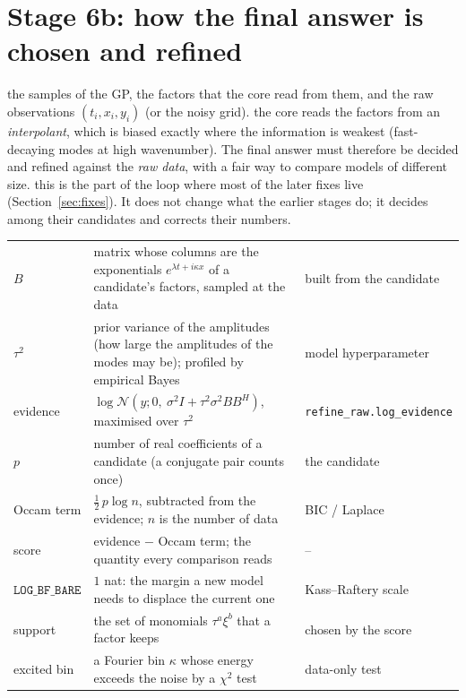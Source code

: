 \section{Stage 6b: how the final answer is chosen and refined}\label{sec:refine}
\sectionbrief
{the samples of the GP, the factors that the core read from them, and the raw observations $(t_i,x_i,y_i)$ (or the noisy grid).}
{the core reads the factors from an \emph{interpolant}, which is biased exactly where the information is weakest (fast-decaying modes at high wavenumber). The final answer must therefore be decided and refined against the \emph{raw data}, with a fair way to compare models of different size.}
{this is the part of the loop where most of the later fixes live (Section~\ref{sec:fixes}). It does not change what the earlier stages do; it decides among their candidates and corrects their numbers.}

\begin{symbols}
\begin{tabular}{@{}L{2.6cm}L{6.0cm}L{4.3cm}@{}}
$B$ & matrix whose columns are the exponentials $e^{\lambda t+i\kappa x}$ of a candidate's factors, sampled at the data & built from the candidate\\
$\tau^2$ & prior variance of the amplitudes (how large the amplitudes of the modes may be); profiled by empirical Bayes & model hyperparameter\\
evidence & $\log\mathcal N(y;0,\ \sigma^2I+\tau^2\sigma^2BB^{H})$, maximised over $\tau^2$ & \texttt{refine\_raw.}\allowbreak\texttt{log\_evidence}\\
$p$ & number of real coefficients of a candidate (a conjugate pair counts once) & the candidate\\
Occam term & $\tfrac12\,p\log n$, subtracted from the evidence; $n$ is the number of data & BIC / Laplace\\
score & evidence $-$ Occam term; the quantity every comparison reads & --\\
$\texttt{LOG\_BF\_BARE}$ & $1$ nat: the margin a new model needs to displace the current one & Kass--Raftery scale\\
support & the set of monomials $\tau^a\xi^b$ that a factor keeps & chosen by the score\\
excited bin & a Fourier bin $\kappa$ whose energy exceeds the noise by a $\chi^2$ test & data-only test\\
\end{tabular}
\end{symbols}


